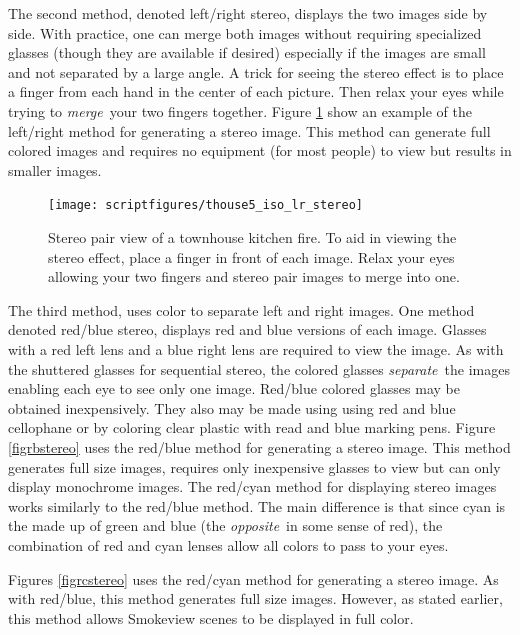 \documentclass[11pt,twoside]{book}
\newcommand{\figoptions}{hbp}
\begin{document}
The second method, denoted left/right stereo, displays the two images side by side.  With practice, one can merge both images without requiring specialized glasses (though they are available if desired) especially if the images are small and not separated by a large angle.
A trick for seeing the stereo effect is to place a finger from each hand in the center of each picture.  Then relax your eyes while trying to {\em merge}\ your two fingers together.  Figure \ref{figlrstereo} show an example of the left/right method for generating a stereo image.  This method can generate full colored images and requires no equipment (for most people) to view but results in smaller images.
\begin{figure}[\figoptions]
\begin{center}
\texttt{[image: scriptfigures/thouse5\_iso\_lr\_stereo]}
\caption[Stereo pair view of a townhouse kitchen fire.]{
Stereo pair view of a townhouse kitchen fire. To aid in viewing the stereo effect, place
a finger in front of each image.  Relax your eyes allowing your two fingers and stereo pair
images to merge into one.
}
\label{figlrstereo}
\end{center}
\end{figure}

The third method, uses color to separate left and right images.  One method denoted red/blue stereo, displays red and blue versions of each image.  Glasses with a red left lens and a blue right lens are required to view the image.  As with the shuttered glasses for sequential stereo, the colored glasses {\em separate}\ the images enabling each eye to see only one image.  Red/blue colored glasses may be obtained inexpensively.
They also may be made using using red and blue cellophane or by coloring clear plastic with read and blue marking pens.  Figure \ref{figrbstereo} uses the red/blue method for generating a stereo image.  This method generates full size images, requires only inexpensive glasses to view but can only display monochrome images.
The red/cyan method for displaying stereo images works similarly to the red/blue method.  The main difference is that since cyan is the made up of green and blue (the {\em opposite}\ in some sense of red), the combination of red and cyan lenses allow all colors to pass to your eyes.

Figures \ref{figrcstereo} uses the red/cyan method for generating a stereo image.  As with red/blue, this method generates full size images.  However, as stated earlier, this method allows Smokeview scenes to be displayed in full color.
\end{document}
